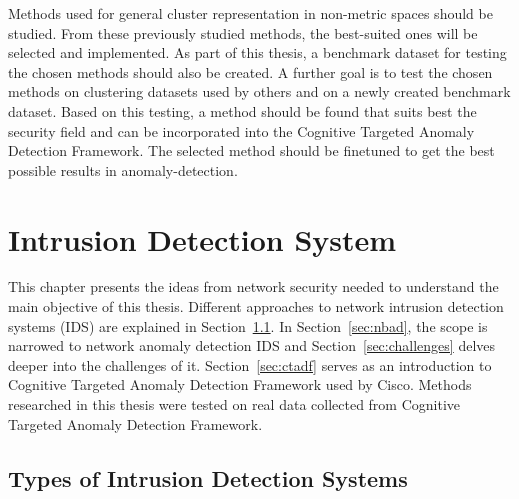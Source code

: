 \documentclass[thesis=B,english]{FITthesis}[2012/10/20]
\begin{document}
Methods used for general cluster representation in non-metric spaces should be studied.
From these previously studied methods, the best-suited ones will be selected and implemented.
As part of this thesis, a benchmark dataset for testing the chosen methods should also be created.
A further goal is to test the chosen methods on clustering datasets used by others and on a newly created benchmark dataset.
Based on this testing, a method should be found that suits best the security field and can be incorporated into the Cognitive Targeted Anomaly Detection Framework.
The selected method should be finetuned to get the best possible results in anomaly-detection.



\chapter{Intrusion Detection System}\label{ch:ids}

This chapter presents the ideas from network security needed to understand the main objective of this thesis.
Different approaches to network intrusion detection systems (IDS) are explained in Section~\ref{sec:ids}.
In Section~\ref{sec:nbad}, the scope is narrowed to network anomaly detection IDS and Section~\ref{sec:challenges} delves deeper into the challenges of it.
Section~\ref{sec:ctadf} serves as an introduction to Cognitive Targeted Anomaly Detection Framework used by Cisco.
Methods researched in this thesis were tested on real data collected from Cognitive Targeted Anomaly Detection Framework.

\section{Types of Intrusion Detection Systems}\label{sec:ids}
\end{document}
